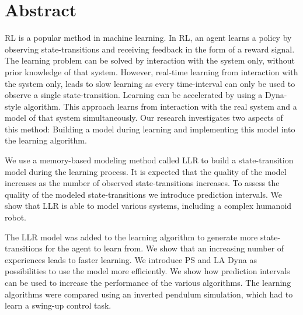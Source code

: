 \chapter{Abstract}



\acf{RL} is a popular method in machine learning. In RL, an agent learns a policy by observing state-transitions and receiving feedback in the form of a reward signal. The learning problem can be solved by interaction with the system only, without prior knowledge of that system. However, real-time learning from interaction with the system only, leads to slow learning as every time-interval can only be used to observe a single state-transition. Learning can be accelerated by using a Dyna-style algorithm. This approach learns from interaction with the real system and a model of that system simultaneously. Our research investigates two aspects of this method: Building a model during learning and implementing this model into the learning algorithm.

We use a memory-based modeling method called \acf{LLR} to build a state-transition model during the learning process. It is expected that the quality of the model increases as the number of observed state-transitions increases. To assess the quality of the modeled state-transitions we introduce prediction intervals. We show that LLR is able to model various systems, including a complex humanoid robot.

The \acs{LLR} model was added to the learning algorithm to generate more state-transitions for the agent to learn from. We show that an increasing number of experiences leads to faster learning. We introduce \acf{PS} and \acf{LA Dyna} as possibilities to use the model more efficiently. We show how prediction intervals can be used to increase the performance of the various algorithms. The learning algorithms were compared using an inverted pendulum simulation, which had to learn a swing-up control task.



